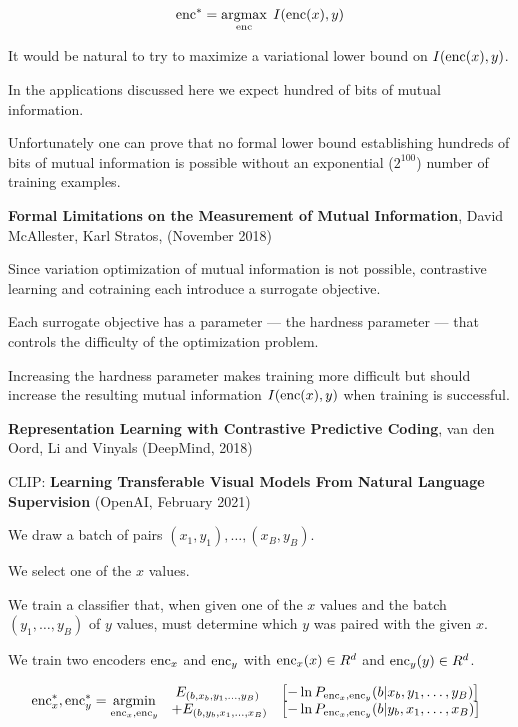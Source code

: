 {$$\mathrm{enc}^* = \operatorname*{argmax}_{\mathrm{enc}}\; I(\mathrm{enc}(x),y)$$

\vfill
{\huge
It would be natural to try to maximize a variational lower bound on $I(\mathrm{enc}(x),y)$.

\vfill
In the applications discussed here we expect hundred of bits of mutual information.

\vfill
Unfortunately one can prove that no formal lower bound
establishing hundreds of bits of mutual information  is possible without an exponential ($2^{100}$) number of training examples.

\vfill
{\bf Formal Limitations on the Measurement of Mutual Information},
David McAllester, Karl Stratos, (November 2018)
}


Since variation optimization of mutual information is not possible, contrastive learning and cotraining each introduce a surrogate objective.

\vfill
Each surrogate objective has a parameter --- the hardness parameter --- that controls the difficulty of the optimization problem.

\vfill
Increasing the hardness parameter makes training more difficult but should increase the resulting mutual information $I(\mathrm{enc}(x),y)$
when training is successful.


{\bf Representation Learning with Contrastive Predictive Coding}, van den Oord, Li and Vinyals (DeepMind, 2018)

\vfill
CLIP: {\bf Learning Transferable Visual Models From Natural Language Supervision} (OpenAI, February 2021)


We draw a batch of pairs $(x_1,y_1),\ldots,(x_B,y_B)$.

\vfill
We select one of the $x$ values.

\vfill
We train a classifier that, when given one of the $x$ values and the batch $(y_1,\ldots,y_B)$ of $y$ values, must determine which $y$ was paired with the given $x$.



We train two encoders $\mathrm{enc}_x$ and $\mathrm{enc}_y$ with $\mathrm{enc}_x(x) \in R^d$ and $\mathrm{enc}_y(y) \in R^d$.

{\huge
$$\mathrm{enc}_x^*,\mathrm{enc}_y^* = \operatorname*{argmin}_{\mathrm{enc}_x,\mathrm{enc}_y}\; \begin{array}{cl} E_{(b,x_b,y_1,\ldots,y_B)}\;&\left[-\ln P_{\mathrm{enc}_x,\mathrm{enc}_y}(b|x_b,y_1,\ldots,y_B)\right] \\
+  E_{(b,y_b,x_1,\ldots,x_B)}&\left[-\ln P_{\mathrm{enc}_x,\mathrm{enc}_y}(b|y_b,x_1,\ldots,x_B)\right]\end{array}$$

}}
